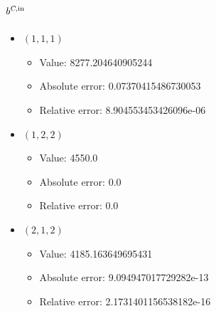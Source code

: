 \documentclass{article}%
\begin{document}
\subsection{$b^{\textsl{C},\text{in}}$}%
\begin{itemize}%
	\item $(1, 1, 1)$%
	\begin{itemize}%
		\item Value: 8277.204640905244%
		\item Absolute error: 0.07370415486730053%
		\item Relative error: 8.904553453426096e-06%
	\end{itemize}%
	\item $(1, 2, 2)$%
	\begin{itemize}%
		\item Value: 4550.0%
		\item Absolute error: 0.0%
		\item Relative error: 0.0%
	\end{itemize}%
	\item $(2, 1, 2)$%
	\begin{itemize}%
		\item Value: 4185.163649695431%
		\item Absolute error: 9.094947017729282e-13%
		\item Relative error: 2.1731401156538182e-16%
	\end{itemize}%
\end{itemize}%
\end{document}
